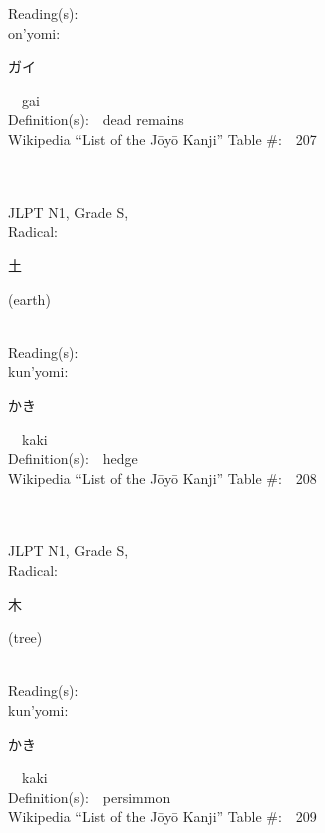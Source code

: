 \begin{multicols}{2}
Reading(s):\ \ \\
{\hspace*{1em}}on'yomi:\ \ \\
{\hspace*{2em}}{\begin{CJK}{UTF8}{min} ガイ \end{CJK}}\ \ gai\ \ \\
Definition(s):\ \ dead remains \\
Wikipedia ``List of the J\=oy\=o Kanji'' Table \#:\ \ 207 \\
\ \ \\
{\fontsize{34pt}{40pt}  }\ \ \\
{JLPT N1, Grade S, \\Radical:\ \ {\begin{CJK}{UTF8}{min} 土 \end{CJK}} (earth) } \\
Reading(s):\ \ \\
{\hspace*{1em}}kun'yomi:\ \ \\
{\hspace*{2em}}{\begin{CJK}{UTF8}{min} かき \end{CJK}}\ \ kaki\ \ \\
Definition(s):\ \ hedge \\
Wikipedia ``List of the J\=oy\=o Kanji'' Table \#:\ \ 208 \\
\ \ \\
{\fontsize{34pt}{40pt}  }\ \ \\
{JLPT N1, Grade S, \\Radical:\ \ {\begin{CJK}{UTF8}{min} 木 \end{CJK}} (tree) } \\
Reading(s):\ \ \\
{\hspace*{1em}}kun'yomi:\ \ \\
{\hspace*{2em}}{\begin{CJK}{UTF8}{min} かき \end{CJK}}\ \ kaki\ \ \\
Definition(s):\ \ persimmon \\
Wikipedia ``List of the J\=oy\=o Kanji'' Table \#:\ \ 209 \\

\end{multicols}
